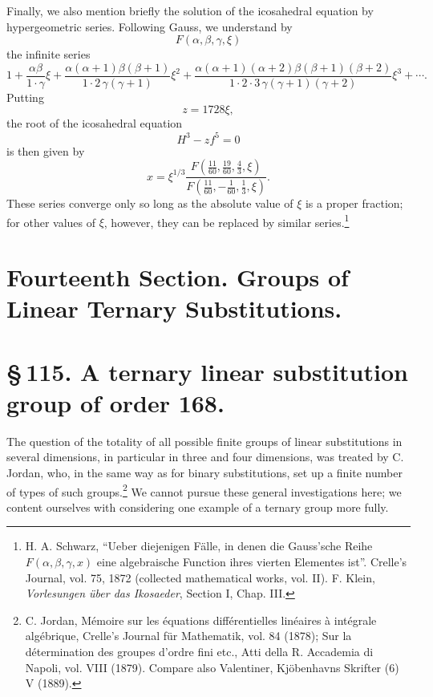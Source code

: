 \documentclass[11pt]{article}
\providecommand{\mat}[4]{\begin{pmatrix}#1&#2\\#3&#4\end{pmatrix}}
\providecommand{\mat}[4]{\begin{pmatrix}#1&#2\\#3&#4\end{pmatrix}}
\providecommand{\mat}[1]{\begin{pmatrix}#1\end{pmatrix}}
\begin{document}
Finally, we also mention briefly the solution of the icosahedral equation by hypergeometric series. Following Gauss, we understand by
\[
F(\alpha,\beta,\gamma,\xi)
\]
the infinite series
\[
1+\frac{\alpha\beta}{1\cdot\gamma}\xi
+\frac{\alpha(\alpha+1)\beta(\beta+1)}{1\cdot2\,\gamma(\gamma+1)}\xi^2
+\frac{\alpha(\alpha+1)(\alpha+2)\beta(\beta+1)(\beta+2)}{1\cdot2\cdot3\,\gamma(\gamma+1)(\gamma+2)}\xi^3+\cdots .
\]
Putting
\[
z=1728\xi,
\]
the root of the icosahedral equation
\[
H^3-zf^5=0
\]
is then given by
\begin{equation}
x=\xi^{1/3}\frac{F\left(\frac{11}{60},\frac{19}{60},\frac{4}{3},\xi\right)}{F\left(\frac{11}{60},-\frac1{60},\frac{1}{3},\xi\right)}.
\tag{14}
\end{equation}
These series converge only so long as the absolute value of \(\xi\) is a proper fraction; for other values of \(\xi\), however, they can be replaced by similar series.\footnote{H. A. Schwarz, ``Ueber diejenigen Fälle, in denen die Gauss'sche Reihe \(F(\alpha,\beta,\gamma,x)\) eine algebraische Function ihres vierten Elementes ist''. Crelle's Journal, vol. 75, 1872 (collected mathematical works, vol. II). F. Klein, \emph{Vorlesungen über das Ikosaeder}, Section I, Chap. III.}


\clearpage
\renewcommand{\mat}[1]{\begin{pmatrix}#1\end{pmatrix}}
\section*{Fourteenth Section. Groups of Linear Ternary Substitutions.}

\section*{\S\,115. A ternary linear substitution group of order 168.}

The question of the totality of all possible finite groups of linear substitutions in several dimensions, in particular in three and four dimensions, was treated by C. Jordan, who, in the same way as for binary substitutions, set up a finite number of types of such groups.\footnote{C. Jordan, Mémoire sur les équations différentielles linéaires à intégrale algébrique, Crelle's Journal für Mathematik, vol. 84 (1878); Sur la détermination des groupes d'ordre fini etc., Atti della R. Accademia di Napoli, vol. VIII (1879). Compare also Valentiner, Kjöbenhavns Skrifter (6) V (1889).} We cannot pursue these general investigations here; we content ourselves with considering one example of a ternary group more fully.
\end{document}
